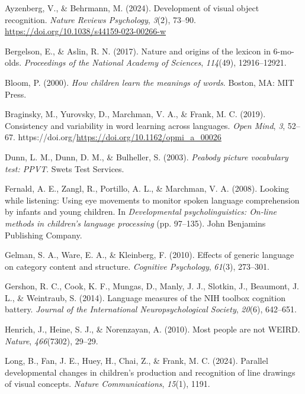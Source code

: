 \documentclass[
  man,mask]{apa6}
\newlength{\cslhangindent}
\newenvironment{CSLReferences}[2] %
 {\begin{list}{}{%
  \setlength{\itemindent}{0pt}
  \setlength{\leftmargin}{0pt}
  \setlength{\parsep}{0pt}
  \ifodd #1
   \setlength{\leftmargin}{\cslhangindent}
   \setlength{\itemindent}{-1\cslhangindent}
  \fi
  \setlength{\itemsep}{#2\baselineskip}}}
 {\end{list}}
\begin{document}
\label{refs}
\begin{CSLReferences}{1}{0}
Ayzenberg, V., \& Behrmann, M. (2024). Development of visual object recognition. \emph{Nature Reviews Psychology}, \emph{3}(2), 73--90. \url{https://doi.org/10.1038/s44159-023-00266-w}

Bergelson, E., \& Aslin, R. N. (2017). Nature and origins of the lexicon in 6-mo-olds. \emph{Proceedings of the National Academy of Sciences}, \emph{114}(49), 12916--12921.

Bloom, P. (2000). \emph{How children learn the meanings of words}. Boston, MA: MIT Press.

Braginsky, M., Yurovsky, D., Marchman, V. A., \& Frank, M. C. (2019). Consistency and variability in word learning across languages. \emph{Open Mind}, \emph{3}, 52--67. https://doi.org/\url{https://doi.org/10.1162/opmi_a_00026}

Dunn, L. M., Dunn, D. M., \& Bulheller, S. (2003). \emph{Peabody picture vocabulary test: PPVT}. Swets Test Services.

Fernald, A. E., Zangl, R., Portillo, A. L., \& Marchman, V. A. (2008). Looking while listening: Using eye movements to monitor spoken language comprehension by infants and young children. In \emph{Developmental psycholinguistics: On-line methods in children's language processing} (pp. 97--135). John Benjamins Publishing Company.

Gelman, S. A., Ware, E. A., \& Kleinberg, F. (2010). Effects of generic language on category content and structure. \emph{Cognitive Psychology}, \emph{61}(3), 273--301.

Gershon, R. C., Cook, K. F., Mungas, D., Manly, J. J., Slotkin, J., Beaumont, J. L., \& Weintraub, S. (2014). Language measures of the NIH toolbox cognition battery. \emph{Journal of the International Neuropsychological Society}, \emph{20}(6), 642--651.

Henrich, J., Heine, S. J., \& Norenzayan, A. (2010). Most people are not WEIRD. \emph{Nature}, \emph{466}(7302), 29--29.

Long, B., Fan, J. E., Huey, H., Chai, Z., \& Frank, M. C. (2024). Parallel developmental changes in children's production and recognition of line drawings of visual concepts. \emph{Nature Communications}, \emph{15}(1), 1191.


\end{CSLReferences}
\end{document}
